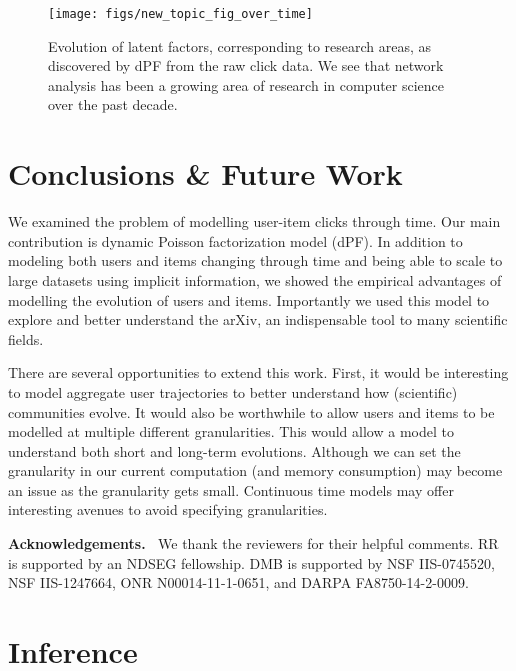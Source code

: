 \documentclass{sig-alternate}
\newcommand{\mypar}[1]{\vspace{0.1in}\noindent \textbf{#1 \,}}
\begin{document}
\begin{figure}
\begin{center}
\texttt{[image: figs/new\_topic\_fig\_over\_time]}
\caption{Evolution of latent factors, corresponding to research areas, as discovered by dPF from the raw click data.
We see that network analysis has been a growing area of research in computer science over the past decade.}
\label{fig:topics_over_time}
\end{center}
\end{figure}






 \section{Conclusions \& Future Work} 

\noindent
We examined the problem of modelling user-item clicks through time.  Our main
contribution is dynamic Poisson factorization model (dPF). In addition
to modeling both users and items changing through time and being able to scale to large datasets 
using implicit information, we
showed the empirical advantages of modelling the evolution of users and items.
Importantly we used this model to explore and better understand the arXiv, an 
indispensable tool to many scientific fields.

There are several opportunities to extend this work. First, it would be
interesting to model aggregate user trajectories to better understand how
(scientific) communities evolve. It would also be worthwhile to allow users and
items to be modelled at multiple different granularities. This would allow a
model to understand both short and long-term evolutions. Although we can set
the granularity in our current computation (and memory consumption) may become
an issue as the granularity gets small.  Continuous time models may offer
interesting avenues to avoid specifying granularities.


 
\mypar{Acknowledgements.} We thank the reviewers for their helpful
comments. RR is supported by an NDSEG fellowship. DMB is supported by NSF
IIS-0745520, NSF IIS-1247664, ONR N00014-11-1-0651, and DARPA FA8750-14-2-0009.



{

  }


\appendix
\section{Inference}\label{sec:inference}
\end{document}
